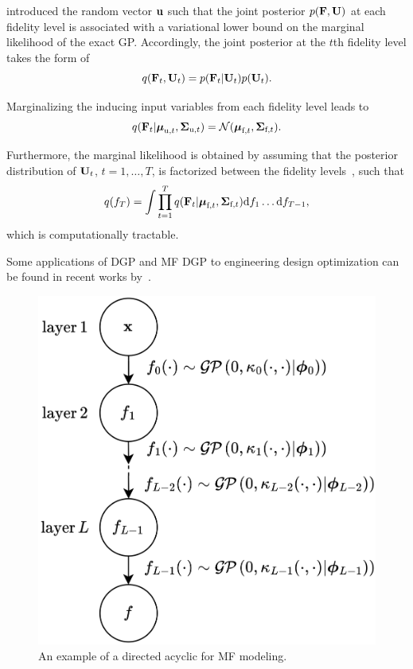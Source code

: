 \documentclass[iicol,sn-basic]{sn-jnl}%
\theoremstyle{thmstyleone}%
\theoremstyle{thmstyletwo}
\theoremstyle{thmstylethree}
\begin{document}
\begin{linenumbers}
\cite{Cutajar2019} introduced the random vector $\bf u$ such that the joint posterior $p({\bf F}, {\bf U})$ at each fidelity level is associated with a variational lower bound on the marginal likelihood of the exact GP.
Accordingly, the joint posterior at the $t$th fidelity level takes the form of
\begin{equation}\label{Eq27}
	q({\bf F}_t,{\bf U}_t) = p({\bf F}_t|{\bf U}_t) p({\bf U}_t).
\end{equation}

Marginalizing the inducing input variables from each fidelity level leads to~\citep{Salimbeni2017}
\begin{equation}\label{Eq28}
	q({\bf F}_t|{\boldsymbol \mu}_{\text{u},t},{\boldsymbol \Sigma}_{\text{u},t}) = \mathcal{N}({\boldsymbol \mu}_{\text{f},t},{\boldsymbol \Sigma}_{\text{f},t}).
\end{equation}

Furthermore, the marginal likelihood is obtained by assuming that the posterior distribution of ${\bf U}_t$, $t=1,\dots,T$, is factorized between the fidelity levels~\citep{Salimbeni2017}, such that
\begin{equation}\label{Eq29}
	q(f_{T}) = \int \prod_{t=1}^{T} q({\bf F}_t|{\boldsymbol \mu}_{\text{f},t},{\boldsymbol \Sigma}_{\text{f},t}) \text{d}f_{1} \dots \text{d}f_{T-1},
\end{equation}
which is computationally tractable.

Some applications of DGP and MF DGP to engineering design optimization can be found in recent works by~\cite{Hebbal2021a,Hebbal2021b}.

\begin{figure}
	\centering
	\includegraphics[scale=0.85]{Fig5.png}
	\caption{An example of a directed acyclic for MF modeling.}
	\label{Fig5}
\end{figure}


\end{linenumbers}
\end{document}
